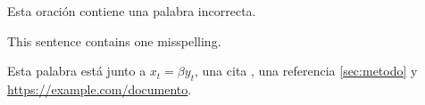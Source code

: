 \documentclass[12pt]{article}
\begin{document}
Esta oración contiene una palabra incorrecta.

This sentence contains one misspelling.

Esta palabra está junto a $x_t = \beta y_t$, una cita \cite{smith2020}, una referencia \ref{sec:metodo} y \url{https://example.com/documento}.
\end{document}
